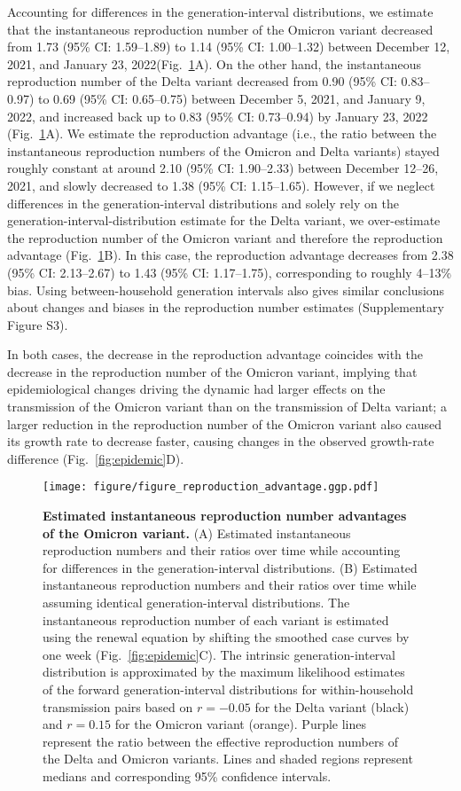 \documentclass[12pt]{article}
\newcommand{\fref}[1]{Fig.~\ref{fig:#1}}
\begin{document}
Accounting for differences in the generation-interval distributions, we estimate that the instantaneous reproduction number of the Omicron variant decreased from 1.73 (95\% CI: 1.59--1.89) to 1.14 (95\% CI: 1.00--1.32) between December 12, 2021, and January 23, 2022(\fref{reproduction}A).
On the other hand, the instantaneous reproduction number of the Delta variant decreased from 0.90 (95\% CI: 0.83--0.97) to 0.69 (95\% CI: 0.65--0.75) between December 5, 2021, and January 9, 2022, and increased back up to 0.83 (95\% CI: 0.73--0.94) by January 23, 2022 (\fref{reproduction}A).
We estimate the reproduction advantage (i.e., the ratio between the instantaneous reproduction numbers of the Omicron and Delta variants) stayed roughly constant at around 2.10 (95\% CI: 1.90--2.33) between December 12--26, 2021, and slowly decreased to 1.38 (95\% CI: 1.15--1.65).
However, if we neglect differences in the generation-interval distributions and solely rely on the generation-interval-distribution estimate for the Delta variant, we over-estimate the reproduction number of the Omicron variant and therefore the reproduction advantage (\fref{reproduction}B).
In this case, the reproduction advantage decreases from 2.38 (95\% CI: 2.13--2.67) to 1.43 (95\% CI: 1.17--1.75), corresponding to roughly 4--13\% bias.
Using between-household generation intervals also gives similar conclusions about changes and biases in the reproduction number estimates (Supplementary Figure S3).

In both cases, the decrease in the reproduction advantage coincides with the decrease in the reproduction number of the Omicron variant, implying that epidemiological changes driving the dynamic had larger effects on the transmission of the Omicron variant than on the transmission of Delta variant;
a larger reduction in the reproduction number of the Omicron variant also caused its growth rate to decrease faster, causing changes in the observed growth-rate difference (\fref{epidemic}D).

\begin{figure}[!th]
\texttt{[image: figure/figure\_reproduction\_advantage.ggp.pdf]}
\caption{
\textbf{Estimated instantaneous reproduction number advantages of the Omicron variant.}
(A) Estimated instantaneous reproduction numbers and their ratios over time while accounting for differences in the generation-interval distributions.
(B) Estimated instantaneous reproduction numbers and their ratios over time while assuming identical generation-interval distributions.
The instantaneous reproduction number of each variant is estimated using the renewal equation by shifting the smoothed case curves by one week (\fref{epidemic}C).
The intrinsic generation-interval distribution is approximated by the maximum likelihood estimates of the forward generation-interval distributions for within-household transmission pairs based on $r=-0.05$ for the Delta variant (black) and $r=0.15$ for the Omicron variant (orange).
Purple lines represent the ratio between the effective reproduction numbers of the Delta and Omicron variants.
Lines and shaded regions represent medians and corresponding 95\% confidence intervals.
\label{fig:reproduction}
}
\end{figure}
\end{document}
